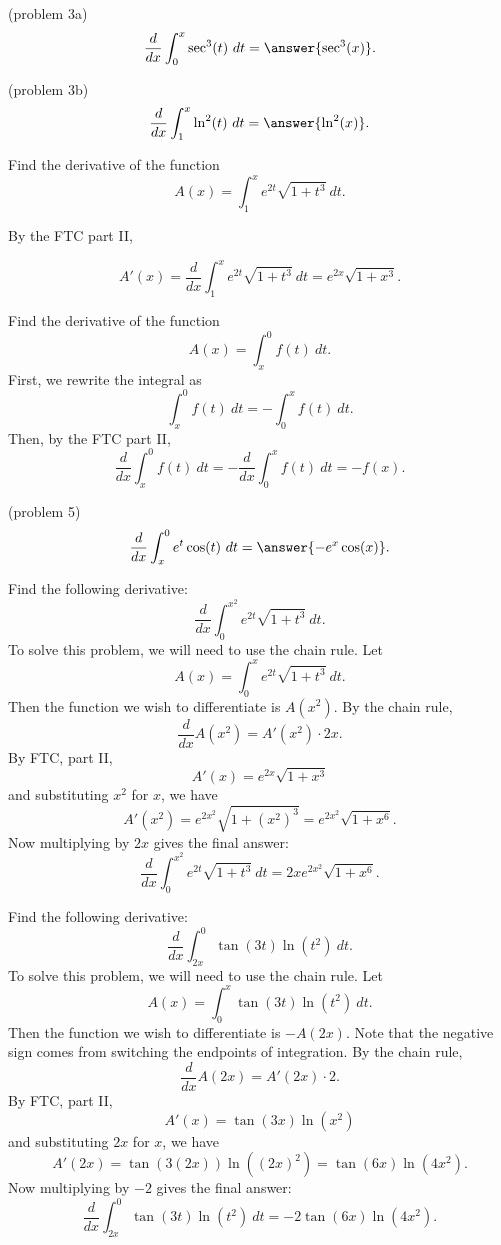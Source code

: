 \documentclass[handout]{ximera}
\begin{document}
\begin{problem}(problem 3a)
\[\frac{d}{dx} \int_0^x \sec^3(t) \ dt = \answer{\sec^3(x)}.\]
\end{problem}

\begin{problem}(problem 3b)
\[\frac{d}{dx} \int_1^x \ln^2(t) \ dt = \answer{\ln^2(x)}.\]
\end{problem}


\begin{example}[example 4]
Find the derivative of the function 
\[A(x) = \int_1^x e^{2t}\sqrt{1+t^3} \ dt.\]

By the FTC part II,

 \[A'(x) = \frac{d}{dx}\int_1^x e^{2t}\sqrt{1+t^3} \ dt = e^{2x}\sqrt{1+x^3}.\]
\end{example} 

\begin{example}[example 5]
Find the derivative of the function 
\[A(x) = \int_x^0 f(t) \ dt.\]
First, we rewrite the integral as
\[\int_x^0 f(t) \ dt =-\int_0^x f(t) \ dt.\]
Then, by the FTC part II,
\[\frac{d}{dx}\int_x^0 f(t) \ dt = -\frac{d}{dx}\int_0^x f(t) \ dt =-f(x).\] 
\end{example}

\begin{problem}(problem 5)
\[\frac{d}{dx} \int_x^0 e^t\cos(t) \ dt = \answer{-e^x\cos(x)}.\]
\end{problem}

  
\begin{example}[example 6]
Find the following derivative:
\[\frac{d}{dx} \int_0^{x^2} e^{2t}\sqrt{1+t^3} \ dt.\]
To solve this problem, we will need to use the chain rule. Let 
\[A(x) = \int_0^x e^{2t}\sqrt{1+t^3} \ dt.\]
Then the function we wish to differentiate is $A(x^2)$.
By the chain rule, 
\[\frac{d}{dx} A(x^2) = A'(x^2) \cdot 2x.\]
By FTC, part II,
\[A'(x) = e^{2x}\sqrt{1+x^3}\]
and substituting $x^2$ for $x$, we have
\[A'(x^2) = e^{2x^2}\sqrt{1+(x^2)^3} = e^{2x^2}\sqrt{1+x^6}.\]
Now multiplying by $2x$ gives the final answer:
\[\frac{d}{dx}\int_0^{x^2} e^{2t}\sqrt{1+t^3} \ dt  = 
2xe^{2x^2}\sqrt{1+x^6}.\]
\end{example}

\begin{example}[example 7]
Find the following derivative:
\[\frac{d}{dx} \int_{2x}^0 \tan(3t) \ln(t^2) \ dt.\]
To solve this problem, we will need to use the chain rule. Let 
\[A(x) = \int_0^x \tan(3t) \ln(t^2) \ dt.\]
Then the function we wish to differentiate is $-A(2x)$.
Note that the negative sign comes from switching the endpoints of integration.
By the chain rule, 
\[\frac{d}{dx} A(2x) = A'(2x) \cdot 2.\]
By FTC, part II,
\[A'(x) = \tan(3x) \ln(x^2)\]
and substituting $2x$ for $x$, we have
\[A'(2x) = \tan(3(2x)) \ln((2x)^2) = \tan(6x) \ln(4x^2).\]
Now multiplying by $-2$ gives the final answer:
\[\frac{d}{dx} \int_{2x}^0 \tan(3t) \ln(t^2) \ dt  = -2\tan(6x)\ln(4x^2).\]
\end{example}
\end{document}
